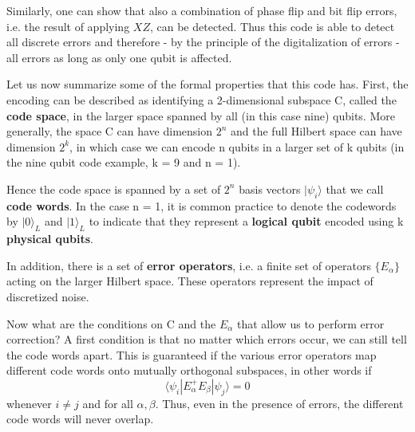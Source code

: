 \documentclass[a4paper, draft]{article}
\theoremstyle{own}
\theoremstyle{remark}
\begin{document}
Similarly, one can show that also a combination of phase flip and bit flip errors, i.e. the result of applying $XZ$, can be detected. Thus this code is able to detect all discrete errors and therefore - by the principle of the digitalization of errors - all errors as long as only one qubit is affected.

Let us now summarize some of the formal properties that this code has. First, the encoding can be described as identifying a 2-dimensional subspace C, called the {\bf code space}, in the larger space spanned by all (in this case nine) qubits. More generally, the space C can have dimension $2^n$ and the full Hilbert space can have dimension $2^k$, in which case we can encode n qubits in a larger set of k qubits (in the nine qubit code example, k = 9 and n = 1). 

Hence the code space is spanned by a set of $2^n$ basis vectors $|\psi_i \rangle$ that we call {\bf code words}. In the case n = 1, it is common practice to denote the codewords by $|0 \rangle_L$ and $|1 \rangle_L$ to indicate that they represent a {\bf logical qubit} encoded using k {\bf physical qubits}. 

In addition, there is a set of {\bf error operators}, i.e. a finite set of operators $\{ E_\alpha\}$ acting on the larger Hilbert space. These operators represent the impact of discretized noise.

Now what are the conditions on C and the $E_\alpha$ that allow us to perform error correction? A first condition is that no matter which errors occur, we can still tell the code words apart. This is guaranteed if the various error operators map different code words onto mutually orthogonal subspaces, in other words if 
$$
\langle \psi_i | E_\alpha^{+} E_\beta | \psi_j \rangle = 0 
$$
whenever $i \neq j$ and for all $\alpha, \beta$. Thus, even in the presence of errors, the different code words will never overlap. 
\end{document}
